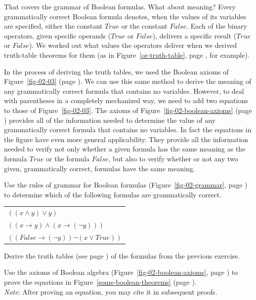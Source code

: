 That covers the grammar of Boolean formulas.
What about meaning?
Every grammatically correct Boolean formula denotes,
when the values of its variables are specified,
either the constant $True$ or the constant $False$.
Each of the binary operators, given specific operands ($True$ or $False$),
delivers a specific result ($True$ or $False$).
We worked out what values the operators deliver
when we derived truth-table theorems for them
(as in Figure~\ref{or-truth-table}, page \pageref{or-truth-table}, for example).

In the process of deriving the truth tables,
we used the Boolean axioms of
Figure~\ref{fig-02-03} (page \pageref{fig-02-03}).
We can use this same method to derive the meaning
of any grammatically correct formula that contains no variables.
However, to deal with parentheses in a completely mechanized way,
we need to add two equations to those of Figure~\ref{fig-02-03}.
The axioms of Figure~\ref{fig-02-boolean-axioms} (page \pageref{fig-02-boolean-axioms})
provides all of the information needed to determine
the value of any grammatically correct formula
that contains no variables.
In fact the equations in the figure have even more general applicability.
They provide all the information needed
to verify not only whether a given formula
has the same meaning as the formula $True$ or the formula $False$,
but also to verify whether or not any two given,
grammatically correct, formulas have the same meaning.

\begin{ExerciseList}

\Exercise Use the rules of grammar for Boolean formulas (Figure~\ref{fig-02-grammar}, page \pageref{fig-02-grammar})
to determine which of the following formulas are grammatically correct.
\begin{center}
\begin{tabular}{l}
$((x \wedge y) \vee y )$ \\
$((x \rightarrow y) \wedge (x \rightarrow (\neg y)))$ \\
$((False \rightarrow (\neg y)) \neg (x \vee True))$ \\
\end{tabular}
\end{center}


\Exercise Derive the truth tables (see page \pageref{truth-tables})
of the formulas from the previous exercise.

\Exercise Use the axioms of Boolean algebra
(Figure~\ref{fig-02-boolean-axioms}, page \pageref{fig-02-boolean-axioms})
to prove the equations in
Figure~\ref{some-boolean-theorems} (page \pageref{some-boolean-theorems}).\\
\emph{Note}: After proving an equation, you may cite it in subsequent proofs.

\end{ExerciseList}

